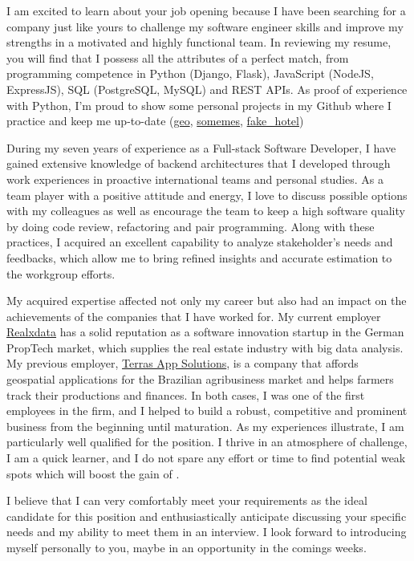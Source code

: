 I am excited to learn about your job opening because I have been searching for a
company just like yours to challenge my software engineer skills and improve my
strengths in a motivated and highly functional team. In reviewing my resume,
you will find that I possess all the attributes of a perfect match, from programming
competence in Python (Django, Flask), JavaScript (NodeJS, ExpressJS), SQL
(PostgreSQL, MySQL) and REST APIs. As proof of experience with Python,
I'm proud to show some personal projects in my Github where I practice and keep
me up-to-date (\href{https://github.com/joaosr/geo}{geo}, \href{https://github.com/joaosr/somemes/tree/target}{somemes},
\href{https://github.com/joaosr/fake_hotel}{fake\_hotel})

During my seven years of experience as a Full-stack Software Developer, I have
gained extensive knowledge of backend architectures that
I developed through work experiences in proactive international teams and personal
studies. As a team player with a positive attitude and energy, I love to discuss
possible options with my colleagues as well as encourage the team to keep a high
software quality by doing code review, refactoring and pair programming. Along
with these practices, I acquired an excellent capability to analyze stakeholder's
needs and feedbacks, which allow me to bring refined insights and accurate estimation
to the workgroup efforts.

My acquired expertise affected not only my career but also had an impact on the
achievements of the companies that I have worked for. My current employer
\href{https://www.realxdata.com/}{Realxdata} has a solid reputation as a software
innovation startup in the German PropTech market, which supplies the real estate
industry with big data analysis. My previous employer, \href{http://terras.agr.br/}{Terras App Solutions},
is a company that affords geospatial applications for the Brazilian agribusiness
market and helps farmers track their productions and finances. In both cases,
I was one of the first employees in the firm, and I helped to build a robust,
competitive and prominent business from the beginning until maturation. As my
experiences illustrate, I am particularly well qualified for the position.
I thrive in an atmosphere of challenge, I am a quick learner, and I do not spare
any effort or time to find potential weak spots which will boost the gain of \companyName.

I believe that I can very comfortably meet your requirements as the ideal candidate
for this position and enthusiastically anticipate discussing your specific needs
and my ability to meet them in an interview. I look forward to introducing myself
personally to you, maybe in an opportunity in the comings weeks.
